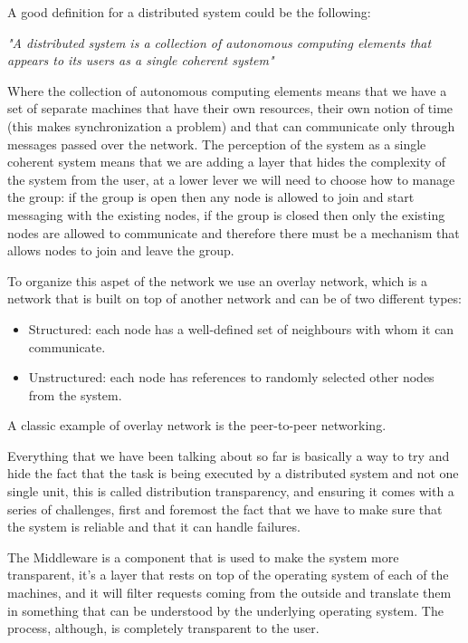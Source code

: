 A good definition for a distributed system could be the following:
\begin{center}
    \textit{"A distributed system is a collection of autonomous computing elements that appears to its users as a single coherent system"}
\end{center}
Where the collection of autonomous computing elements means that we have a set of separate machines that have their own resources, their own notion of time (this makes synchronization a problem) and that can communicate only through messages passed over the network. The perception of the system as a single coherent system means that we are adding a layer that hides the complexity of the system from the user, at a lower lever we will need to choose how to manage the group: if the group is open then any node is allowed to join and start messaging with the existing nodes, if the group is closed then only the existing nodes are allowed to communicate and therefore there must be a mechanism that allows nodes to join and leave the group.

To organize this aspet of the network we use an overlay network, which is a network that is built on top of another network and can be of two different types:
\begin{itemize}
    \item Structured: each node has a well-defined set of neighbours with whom it can communicate.
    \item Unstructured: each node has references to randomly selected other nodes from the system.
\end{itemize}
A classic example of overlay network is the peer-to-peer networking.

Everything that we have been talking about so far is basically a way to try and hide the fact that the task is being executed by a distributed system and not one single unit, this is called distribution transparency, and ensuring it comes with a series of challenges, first and foremost the fact that we have to make sure that the system is reliable and that it can handle failures.

The Middleware is a component that is used to make the system more transparent, it's a layer that rests on top of the operating system of each of the machines, and it will filter requests coming from the outside and translate them in something that can be understood by the underlying operating system. The process, although, is completely transparent to the user.

